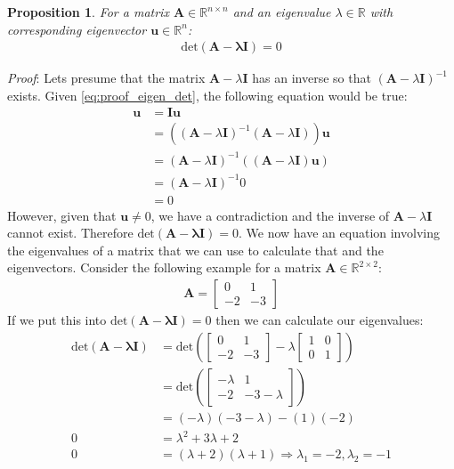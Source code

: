 \documentclass[a4paper,12pt]{book}
\newcommand{\matrx}[1]{\bm{#1}}
\newcommand{\vectr}[1]{\textbf{#1}}
\newcommand{\real}{\mathbb{R}}
\newcommand{\italic}[1]{\textit{#1}}
\newcommand{\dett}[1]{\text{det}(\matrx{#1})}
\newcommand{\mdett}[1]{\text{det} \left ( #1 \right )}
\newtheorem{proposition}{Proposition}[section]
\begin{document}
	\begin{proposition}
		\normalfont For a matrix $ \matrx{A} \in \real^{n \times n} $ and an eigenvalue $ \lambda \in \real $ with corresponding eigenvector $ \vectr{u} \in \real^{n} $: 
		\begin{align}
			\dett{\matrx{A} - \lambda \matrx{I}} = 0
		\end{align}
		\label{prop:det_eigen_eq}
	\end{proposition} 
	\italic{Proof}: Lets presume that the matrix $ \matrx{A} - \lambda \matrx{I} $ has an inverse so that $ (\matrx{A} - \lambda \matrx{I})^{-1} $ exists. Given \ref{eq:proof_eigen_det}, the following equation would be true: 
	\begin{align}
		\vectr{u} &= \matrx{I} \vectr{u} \\
		&= ((\matrx{A} - \lambda \matrx{I})^{-1} (\matrx{A} - \lambda \matrx{I})) \vectr{u} \\
		&= (\matrx{A} - \lambda \matrx{I})^{-1} ((\matrx{A} - \lambda \matrx{I}) \vectr{u}) \\
		&= (\matrx{A} - \lambda \matrx{I})^{-1} 0 \\
		&= 0
	\end{align}
	However, given that $ \vectr{u} \ne 0 $, we have a contradiction and the inverse of $ \matrx{A} - \lambda \matrx{I} $ cannot exist. Therefore $ \dett{\matrx{A} - \lambda \matrx{I}} = 0 $.
	We now have an equation involving the eigenvalues of a matrix that we can use to calculate that and the eigenvectors. Consider the following example for a matrix $ \matrx{A} \in \real^{2 \times 2} $:
	\begin{align}
		\matrx{A} = \begin{bmatrix}
			0 & 1 \\
		   -2 & -3 
		\end{bmatrix}
	\end{align}
	If we put this into $ \dett{\matrx{A} - \lambda \matrx{I}} = 0 $ then we can calculate our eigenvalues:
	\begin{align}
		\dett{\matrx{A} - \lambda \matrx{I}} &= \mdett{\begin{bmatrix}
				0 & 1 \\
				-2 & -3 
			\end{bmatrix} - \lambda \begin{bmatrix}
				1 & 0 \\
				0 & 1
		\end{bmatrix}} \\ &= \mdett{\begin{bmatrix}
				-\lambda & 1 \\
				-2 & -3 - \lambda
		\end{bmatrix}} \\
		&= (-\lambda)(-3-\lambda) - (1)(-2) \\
		\label{eq:char_det} 0 &= \lambda^{2} + 3\lambda + 2 \\
		0 &= (\lambda + 2)(\lambda + 1) \Rightarrow \lambda_1 = -2, \lambda_2 = -1
	\end{align}
\end{document}
